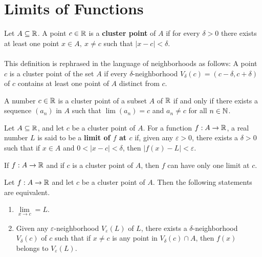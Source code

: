 \section{Limits of Functions}

\begin{definition}
	Let $A \subseteq \mathbb{R}$. A point $c \in \mathbb{R}$ is a \textbf{cluster point} of $A$ if for every $\delta >0$ there exists at least one point $x \in A,\ x \neq c$ such that $|x-c|<\delta$.
	\\\\This definition is rephrased in the language of neighborhoods as follows: A point $c$ is a cluster point of the set $A$ if every $\delta$-neighborhood $V_\delta (c)=(c-\delta, c+\delta)$ of $c$ contains at least one point of $A$ distinct from $c$.
\end{definition}

\begin{theorem}
	A number $c \in \mathbb{R}$ is a cluster point of a subset $A$ of $\mathbb{R}$ if and only if there exists a sequence $(a_n)$ in $A$ such that $\lim (a_n) = c$ and $a_n \neq c$ for all $n \in \mathbb{N}$.
\end{theorem}

\begin{definition}
	Let $A \subseteq \mathbb{R}$, and let $c$ be a cluster point of $A$. For a function $f:A \rightarrow \mathbb{R}$, a real number $L$ is said to be a \textbf{limit of $f$ at $c$} if, given any $\varepsilon>0$, there exists a $\delta>0$ such that if $x \in A$ and $0 < |x-c|<\delta$, then $|f(x)-L|<\varepsilon$.
\end{definition}

\begin{theorem}
	If $f:A \rightarrow \mathbb{R}$ and if $c$ is a cluster point of $A$, then $f$ can have only one limit at $c$.
\end{theorem}

\begin{theorem}
	Let $f:A \rightarrow \mathbb{R}$ and let $c$ be a cluster point of $A$. Then the following statements are equivalent.
	\begin{enumerate}
		\item $\lim\limits_{x\to c}=L$.
		\item Given any $\varepsilon$-neighborhood $V_\varepsilon (L)$ of $L$, there exists a $\delta$-neighborhood $V_\delta (c)$ of $c$ such that if $x \neq c$ is any point in $V_\delta (c) \cap A$, then $f(x)$ belongs to $V_\varepsilon (L)$.
	\end{enumerate}
\end{theorem}

